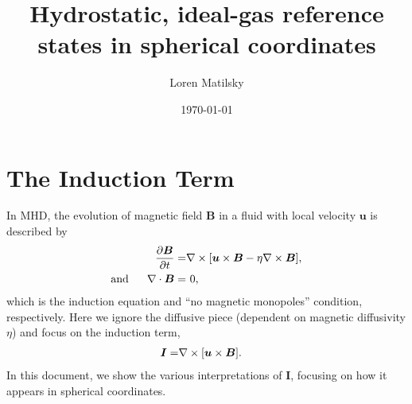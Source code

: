 \documentclass[12pt]{article}
\date{\today}
\author{Loren Matilsky}
\title{Hydrostatic, ideal-gas reference states in spherical coordinates}
\begin{document}
\maketitle

\section{The Induction Term}
In MHD, the evolution of magnetic field $\bm{B}$ in a fluid with local velocity $\bm{u}$ is described by
\begin{align}
	\ \ \ \ \ \frac{\partial\bm{B}}{\partial t} = &\nabla\times[\bm{u}\times\bm{B}-\eta\nabla\times\bm{B}]\label{eq:ind},\\
\text{and}\ \ \ \ \ \nabla\cdot\bm{B} = &\ 0,\label{eq:divb0}
\end{align}
which is the induction equation and ``no magnetic monopoles'' condition, respectively. Here we ignore the diffusive piece (dependent on magnetic diffusivity $\eta$) and focus on the induction term, 
\begin{align}
	\bm{I} =&\nabla\times[\bm{u}\times\bm{B}]\label{eq:indterm}.
\end{align}
In this document, we show the various interpretations of $\bm{I}$, focusing on how it appears in spherical coordinates. 
\end{document}
